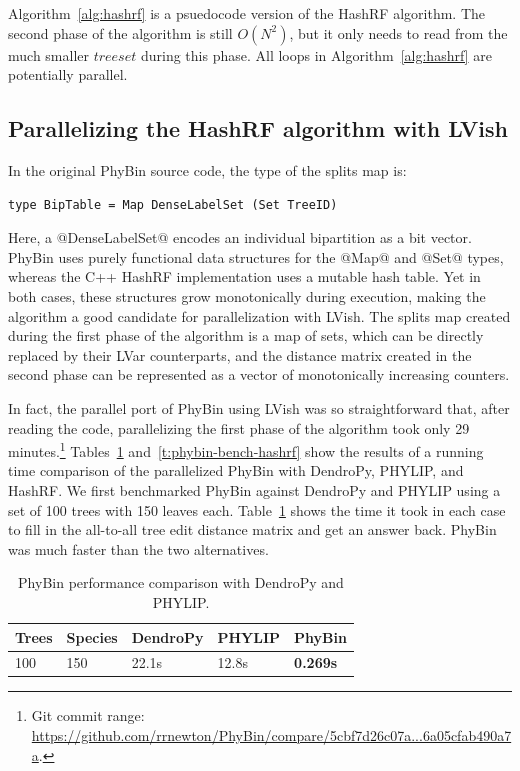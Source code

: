 Algorithm~\ref{alg:hashrf} is a psuedocode version of the HashRF
algorithm.  The second phase of the algorithm is still $O(N^2)$, but
it only needs to read from the much smaller $\mathit{treeset}$ during
this phase.  All loops in Algorithm~\ref{alg:hashrf} are potentially
parallel.

\subsection{Parallelizing the HashRF algorithm with LVish}

In the original PhyBin source code, the type of the splits map is:

\singlespacing
\begin{lstlisting}
type BipTable = Map DenseLabelSet (Set TreeID)
\end{lstlisting}
\doublespacing

\noindent Here, a @DenseLabelSet@ encodes an individual bipartition as
a bit vector.  PhyBin uses purely functional data structures for the
@Map@ and @Set@ types, whereas the C++ HashRF implementation uses a
mutable hash table.  Yet in both cases, these structures grow
monotonically during execution, making the algorithm a good candidate
for parallelization with LVish.  The splits map created during the
first phase of the algorithm is a map of sets, which can be directly
replaced by their LVar counterparts, and the distance matrix created
in the second phase can be represented as a vector of monotonically
increasing counters.

In fact, the parallel port of PhyBin using LVish was so
straightforward that, after reading the code, parallelizing the first
phase of the algorithm took only 29 minutes.\footnote{Git commit
  range:
  \url{https://github.com/rrnewton/PhyBin/compare/5cbf7d26c07a...6a05cfab490a7a}.}
Tables~\ref{t:phybin-bench} and~\ref{t:phybin-bench-hashrf} show the
results of a running time comparison of the parallelized PhyBin with
DendroPy, PHYLIP, and HashRF.  We first benchmarked PhyBin against
DendroPy and PHYLIP using a set of 100 trees with 150 leaves each.
Table~\ref{t:phybin-bench} shows the time it took in each case to fill
in the all-to-all tree edit distance matrix and get an answer back.
PhyBin was much faster than the two alternatives.

\begin{table}
\begin{tabularx}{.75\textwidth}{XXXXX}
Trees & Species & DendroPy & PHYLIP & PhyBin    \\ \hline
100   & 150     & 22.1s    & 12.8s  & \textbf{0.269s}
\end{tabularx}
\caption{PhyBin performance comparison with DendroPy and PHYLIP.}
\label{t:phybin-bench}
\end{table}


